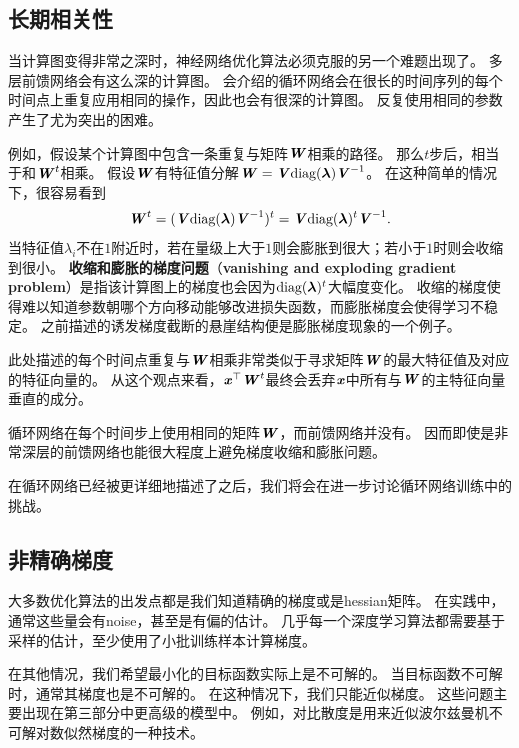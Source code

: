 \subsection{长期相关性}
\label{sec:long_term_dependencies}
当计算图变得非常之深时，神经网络优化算法必须克服的另一个难题出现了。
多层前馈网络会有这么深的计算图。
会介绍的循环网络会在很长的时间序列的每个时间点上重复应用相同的操作，因此也会有很深的计算图。
反复使用相同的参数产生了尤为突出的困难。


例如，假设某个计算图中包含一条重复与矩阵$\boldsymbol{\mathit{W}}$相乘的路径。
那么$t$步后，相当于和$\boldsymbol{\mathit{W}}^t$相乘。
假设$\boldsymbol{\mathit{W}}$有特征值分解$\boldsymbol{\mathit{W}} = \boldsymbol{\mathit{V}} \text{diag}(\boldsymbol{\lambda}) \boldsymbol{\mathit{V}}^{-1}$。
在这种简单的情况下，很容易看到
\begin{equation}
  \boldsymbol{\mathit{W}}^t = (\boldsymbol{\mathit{V}} \text{diag}(\boldsymbol{\lambda}) \boldsymbol{\mathit{V}}^{-1})^t = \boldsymbol{\mathit{V}}\text{diag}(\boldsymbol{\lambda})^t  \boldsymbol{\mathit{V}}^{-1}.
\end{equation}
当特征值$\lambda_i$不在$1$附近时，若在量级上大于$1$则会膨胀到很大；若小于$1$时则会收缩到很小。
\textbf{收缩和膨胀的梯度问题}（\textbf{vanishing and exploding gradient problem}）是指该计算图上的梯度也会因为$\text{diag}(\boldsymbol{\lambda})^t$大幅度变化。
收缩的梯度使得难以知道参数朝哪个方向移动能够改进损失函数，而膨胀梯度会使得学习不稳定。
之前描述的诱发梯度截断的悬崖结构便是膨胀梯度现象的一个例子。

此处描述的每个时间点重复与$\boldsymbol{\mathit{W}}$相乘非常类似于寻求矩阵$\boldsymbol{\mathit{W}}$的最大特征值及对应的特征向量的。
从这个观点来看，$\boldsymbol{\mathit{x}}^\top\boldsymbol{\mathit{W}}^t$最终会丢弃$\boldsymbol{\mathit{x}}$中所有与$\boldsymbol{\mathit{W}}$的主特征向量垂直的成分。

循环网络在每个时间步上使用相同的矩阵$\boldsymbol{\mathit{W}}$，而前馈网络并没有。
因而即使是非常深层的前馈网络也能很大程度上避免梯度收缩和膨胀问题\citep{Sussillo14}。

在循环网络已经被更详细地描述了之后，我们将会在进一步讨论循环网络训练中的挑战。

\subsection{非精确梯度}
\label{sec:inexact_gradients}
大多数优化算法的出发点都是我们知道精确的梯度或是\gls{hessian}矩阵。
在实践中，通常这些量会有\gls{noise}，甚至是有偏的估计。
几乎每一个深度学习算法都需要基于采样的估计，至少使用了小批训练样本计算梯度。


在其他情况，我们希望最小化的目标函数实际上是不可解的。
当目标函数不可解时，通常其梯度也是不可解的。
在这种情况下，我们只能近似梯度。
这些问题主要出现在第三部分中更高级的模型中。
例如，对比散度是用来近似波尔兹曼机不可解对数似然梯度的一种技术。


